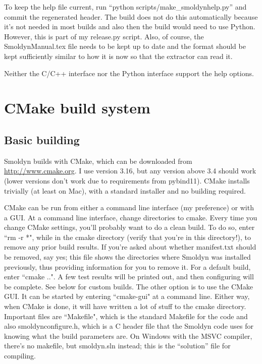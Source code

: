 \documentclass {scrbook}
\begin{document}
To keep the help file current, run ``python scripts/make\_smoldynhelp.py'' and commit the regenerated header. The build does not do this automatically because it's not needed in most builds and also then the build would need to use Python. However, this is part of my release.py script. Also, of course, the SmoldynManual.tex file needs to be kept up to date and the format should be kept sufficiently similar to how it is now so that the extractor can read it.

Neither the C/C++ interface nor the Python interface support the help options.


\section{CMake build system}

\subsection{Basic building}

Smoldyn builds with CMake, which can be downloaded from \url{http://www.cmake.org}. I use version 3.16, but any version above 3.4 should work (lower versions don't work due to requirements from pybind11). CMake installs trivially (at least on Mac), with a standard installer and no building required.

CMake can be run from either a command line interface (my preference) or with a GUI. At a command line interface, change directories to cmake. Every time you change CMake settings, you'll probably want to do a clean build. To do so, enter ``rm -r *", while in the cmake directory (verify that you're in this directory!), to remove any prior build results. If you're asked about whether manifest.txt should be removed, say yes; this file shows the directories where Smoldyn was installed previously, thus providing information for you to remove it. For a default build, enter ``cmake ..". A few test results will be printed out, and then configuring will be complete. See below for custom builds. The other option is to use the CMake GUI. It can be started by entering ``cmake-gui" at a command line. Either way, when CMake is done, it will have written a lot of stuff to the cmake directory. Important files are ``Makefile", which is the standard Makefile for the code and also smoldynconfigure.h, which is a C header file that the Smoldyn code uses for knowing what the build parameters are. On Windows with the MSVC compiler, there's no makefile, but smoldyn.sln instead; this is the ``solution'' file for compiling.
\end{document}
